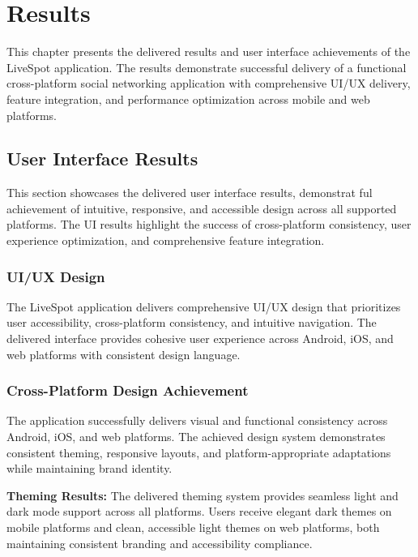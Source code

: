 \chapter{Results}\label{ch:results}

This chapter presents the delivered results and user interface achievements of the LiveSpot application. The results demonstrate successful delivery of a functional cross-platform social networking application with comprehensive UI/UX delivery, feature integration, and performance optimization across mobile and web platforms.

\section{User Interface Results}\label{sec:ui_results}

This section showcases the delivered user interface results, demonstrat
ful achievement of intuitive, responsive, and accessible design across all supported platforms. The UI results highlight the success of cross-platform consistency, user experience optimization, and comprehensive feature integration.

\subsection{UI/UX Design}\label{subsec:ui_ux_design}

The LiveSpot application delivers comprehensive UI/UX design that prioritizes user accessibility, cross-platform consistency, and intuitive navigation. The delivered interface provides cohesive user experience across Android, iOS, and web platforms with consistent design language.

\subsection{Cross-Platform Design Achievement}\label{subsec:cross_platform_design}

The application successfully delivers visual and functional consistency across Android, iOS, and web platforms. The achieved design system demonstrates consistent theming, responsive layouts, and platform-appropriate adaptations while maintaining brand identity.

\textbf{Theming Results:}
The delivered theming system provides seamless light and dark mode support across all platforms. Users receive elegant dark themes on mobile platforms and clean, accessible light themes on web platforms, both maintaining consistent branding and accessibility compliance.

